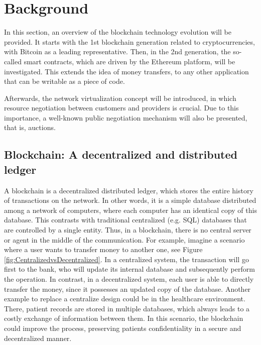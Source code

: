 \chapter{Background}
\label{ch:background}

In this section, an overview of the blockchain technology evolution will be provided. It starts with the 1st blockchain generation related to cryptocurrencies, with Bitcoin as a leading representative. Then, in the 2nd generation, the so-called smart contracts, which are driven by the Ethereum platform, will be investigated. This extends the idea of money transfers, to any other application that can be writable as a piece of code.

Afterwards, the network virtualization concept will be introduced, in which resource negotiation between customers and providers is crucial. Due to this importance, a well-known public negotiation mechanism will also be presented, that is, auctions.

\section{Blockchain: A decentralized and distributed ledger}

A blockchain is a decentralized distributed ledger, which stores the entire history of transactions on the network. In other words, it is a simple database distributed among a network of computers, where each computer has an identical copy of this database. This contrasts with traditional centralized (e.g. SQL) databases that are controlled by a single entity. Thus, in a blockchain, there is no central server or agent in the middle of the communication. For example, imagine a scenario where a user wants to transfer money to another one, see Figure \ref{fig:CentralizedvsDecentralized}. In a centralized system, the transaction will go first to the bank, who will update its internal database and subsequently perform the operation. In contrast, in a decentralized system, each user is able to directly transfer the money, since it possesses an updated copy of the database. Another example to replace a centralize design could be in the healthcare environment. There, patient records are stored in multiple databases, which always leads to a costly exchange of information between them. In this scenario, the blockchain could improve the process, preserving patients confidentiality in a secure and decentralized manner.

